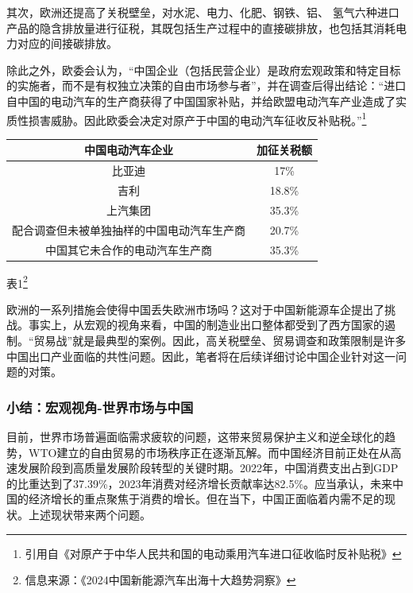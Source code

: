 \documentclass[a4paper, 10pt]{article}
\begin{document}
    其次，欧洲还提高了关税壁垒，对水泥、电力、化肥、钢铁、铝、
    氢气六种进口产品的隐含排放量进行征税，其既包括生产过程中的直接碳排放，也包括其消耗电力对应的间接碳排放。
    
    除此之外，欧委会认为，“中国企业（包括民营企业）是政府宏观政策和特定目标的实施者，而不是有权独立决策的自由市场参与者”，并在调查后得出结论：“进口自中国的电动汽车的生产商获得了中国国家补贴，并给欧盟电动汽车产业造成了实质性损害威胁。因此欧委会决定对原产于中国的电动汽车征收反补贴税。”\footnote {引用自《对原产于中华人民共和国的电动乘用汽车进口征收临时反补贴税》}
    \vspace{10pt}
    \begin{center}
    \begin{tabular}{|c|c|}
      \hline
      中国电动汽车企业 & 加征关税额\\
      \hline
      比亚迪 & 17\%\\
      \hline
      吉利 & 18.8\%\\
      \hline
      上汽集团 & 35.3\%\\
      \hline
      配合调查但未被单独抽样的中国电动汽车生产商 & 20.7\%\\
      \hline
      中国其它未合作的电动汽车生产商 & 35.3\%\\
      \hline
    \end{tabular}

    \vspace{10pt}

表1\footnote{信息来源：《2024中国新能源汽车出海十大趋势洞察》}

  \end{center}
  \vspace{10pt}
    欧洲的一系列措施会使得中国丢失欧洲市场吗？这对于中国新能源车企提出了挑战。事实上，从宏观的视角来看，中国的制造业出口整体都受到了西方国家的遏制。“贸易战”就是最典型的案例。因此，高关税壁垒、贸易调查和政策限制是许多中国出口产业面临的共性问题。因此，笔者将在后续详细讨论中国企业针对这一问题的对策。
    \subsubsection{小结：宏观视角-世界市场与中国}
    目前，世界市场普遍面临需求疲软的问题，这带来贸易保护主义和逆全球化的趋势，WTO建立的自由贸易的市场秩序正在逐渐瓦解。而中国经济目前正处在从高速发展阶段到高质量发展阶段转型的关键时期。2022年，中国消费支出占到GDP的比重达到了37.39\%，2023年消费对经济增长贡献率达82.5\%。应当承认，未来中国的经济增长的重点聚焦于消费的增长。但在当下，中国正面临着内需不足的现状。上述现状带来两个问题。
    
\end{document}
